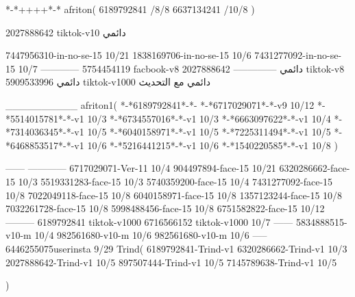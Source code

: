 *-*++++*-*
afriton(
6189792841 /8/8
6637134241 /10/8
)

2027888642 tiktok-v10
دائمي


7447956310-in-no-se-15 10/21
1838169706-in-no-se-15 10/6
7431277092-in-no-se-15 10/7
------------
5754454119 facbook-v8
دائمي
--------------
2027888642 tiktok-v8
دائمي
5909533996 tiktok-v1000
دائمي مع التحديث

__________
afriton1(
*-*6189792841*-*-
*-*6717029071*-*-v9 10/12
*-*5514015781*-*-v1 10/3
*-*6734557016*-*-v1 10/3
*-*6663097622*-*-v1 10/4
*-*7314036345*-*-v1 10/5
*-*6040158971*-*-v1 10/5
*-*7225311494*-*-v1 10/5
*-*6468853517*-*-v1 10/6
*-*5216441215*-*-v1 10/6
*-*1540220585*-*-v1 10/8
)

------
------------
6717029071-Ver-11
10/4
904497894-face-15 10/21
6320286662-face-15 10/3
5519331283-face-15 10/3
5740359200-face-15 10/4
7431277092-face-15 10/8
7022049118-face-15 10/8
6040158971-face-15 10/8
1357123244-face-15 10/8
7032261728-face-15 10/8
5998488456-face-15 10/8
6751582822-face-15 10/12
---------
6189792841 tiktok-v1000
6716566152 tiktok-v1000
10/7
------
5834888515-v10-m 10/4
982561680‏-v10-m 10/6
982561680-v10-m 10/6
-----
6446255075userinsta 9/29
Trind(
6189792841-Trind-v1 
6320286662-Trind-v1 10/3
2027888642-Trind-v1 10/5
897507444-Trind-v1 10/5
7145789638-Trind-v1 10/5

)
